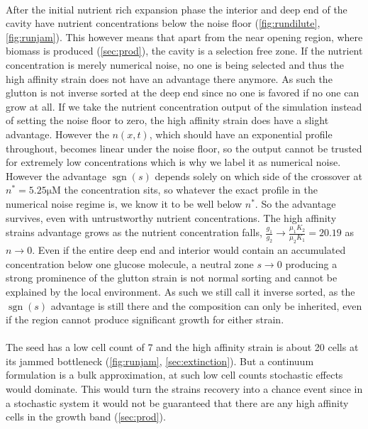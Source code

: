 \documentclass[11pt,a4paper]{report}
\newcommand{\sgn}{\operatorname{sgn}}
\begin{document}
	\\
	After the initial nutrient rich expansion phase the interior and deep end of the cavity have nutrient concentrations below the noise floor (\cref{fig:rundilute}, \cref{fig:runjam}). This however means that apart from the near opening region, where biomass is produced (\cref{sec:prod}), the cavity is a selection free zone. If the nutrient concentration is merely numerical noise, no one is being selected and thus the high affinity strain does not have an advantage there anymore. As such the glutton is not inverse sorted at the deep end since no one is favored if no one can grow at all. If we take the nutrient concentration output of the simulation instead of setting the noise floor to zero, the high affinity strain does have a slight advantage. However the $n(x,t)$, which should have an exponential profile throughout, becomes linear under the noise floor, so the output cannot be trusted for extremely low concentrations which is why we label it as numerical noise. However the advantage $\sgn(s)$ depends solely on which side of the crossover at $n^*=5.25 \mathrm{\mu M}$ the concentration sits, so whatever the exact profile in the numerical noise regime is, we know it to be well below $n^*$. So the advantage survives, even with untrustworthy nutrient concentrations. The high affinity strains advantage grows as the nutrient concentration falls, $\frac{g_1}{g_2} \to \frac{\mu_1 K_2}{\mu_2 K_1} = 20.19$ as $n \to 0$. Even if the entire deep end and interior would contain an accumulated concentration below one glucose molecule, a neutral zone $s \to 0$ producing a strong prominence of the glutton strain is not normal sorting and cannot be explained by the local environment. As such we still call it inverse sorted, as the $\sgn(s)$ advantage is still there and the composition can only be inherited, even if the region cannot produce significant growth for either strain.\\
	\\
	The seed has a low cell count of 7 and the high affinity strain is about 20 cells at its jammed bottleneck (\cref{fig:runjam}, \cref{sec:extinction}). But a continuum formulation is a bulk approximation, at such low cell counts stochastic effects would dominate. This would turn the strains recovery into a chance event since in a stochastic system it would not be guaranteed that there are any high affinity cells in the growth band (\cref{sec:prod}).
\end{document}
